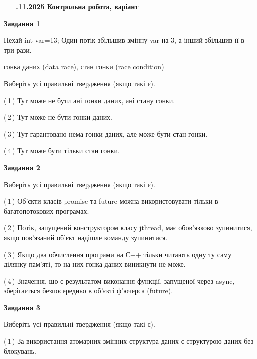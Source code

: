 \documentclass[12pt, ukrainian]{article}
\begin{document}
\begin {large}

\textbf{\_\_.11.2025 Контрольна робота, варіант  }\par


{

\begin{center}
\textbf{Завдання 1}
\end{center}
Нехай int var=13; Один потік збільшив змінну var на 3, а інший збільшив її в три рази.

гонка даних (data race), стан гонки (race condition)

Виберіть усі правильні твердження (якщо такі є).\par
\vspace{2mm}
(\,1\,) Тут може не бути ані гонки даних, ані стану гонки.%

(\,2\,) Тут може не бути гонки даних.%

(\,3\,) Тут гарантовано нема гонки даних, але може бути стан гонки.%

(\,4\,) Тут може бути тільки стан гонки.%



\begin{center}
\textbf{Завдання 2}
\end{center}
Виберіть усі правильні твердження (якщо такі є).\par
\vspace{2mm}

(\,1\,) Об’єкти класів promise та future можна використовувати тільки в багатопотокових програмах.%

(\,2\,) Потік, запущений конструктором класу jthread, має обов’язково зупинитися, якщо пов’язаний об’єкт надішле команду зупинитися.%

(\,3\,) Якщо два обчислення програми на С++ тільки читають одну ту саму ділянку пам'яті, то на них гонка даних  виникнути не може.%

(\,4\,) Значення, що є результатом виконання функції, запущеної через async, зберігається безпосередньо в об’єкті ф’ючерса (future).%



\begin{center}
\textbf{Завдання 3}
\end{center}
Виберіть усі правильні твердження (якщо такі є).\par
\vspace{2mm}

(\,1\,) За використання атомарних змінних структура даних є структурою даних без блокувань.%

}
\end{large}
\end{document}
